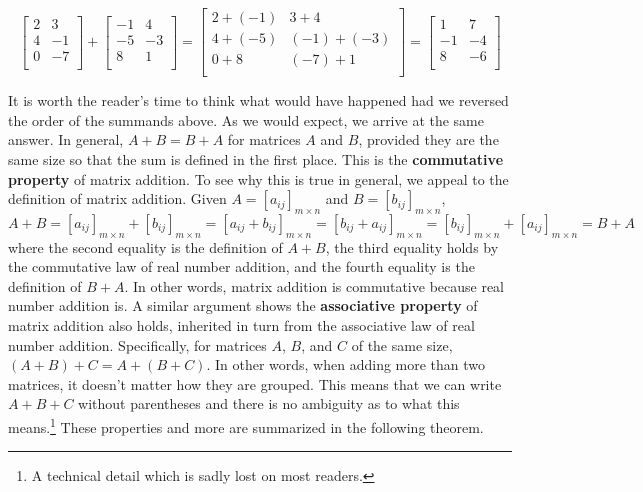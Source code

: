 \[ \left[ \begin{array}{rr}2 & 3 \\ 4 & -1 \\ 0 & -7 \\ \end{array} \right] + \left[ \begin{array}{rr} -1 & 4 \\ -5 & -3 \\ 8 & 1 \\ \end{array} \right] = \left[ \begin{array}{rr} 2 + (-1) & 3+4 \\ 4+(-5) & (-1)+(-3) \\ 0+8 & (-7)+ 1 \\ \end{array} \right]  = \left[ \begin{array}{rr} 1 & 7 \\ -1 & -4 \\ 8 & -6 \\ \end{array} \right] \]

It is worth the reader's time to think what would have happened had we reversed the order of the summands above.  As we would expect, we arrive at the same answer.  In general, $A+B = B+A$ for matrices $A$ and $B$, provided they are the same size so that the sum is defined in the first place.  This is the   \textbf{commutative property} of matrix addition.  To see why this is true in general, we appeal to the definition of matrix addition.  Given $A =\left[a_{ij}\right]_{m \times n}$ and $B =\left[b_{ij}\right]_{m \times n}$, \[A + B = \left[a_{ij}\right]_{m \times n} + \left[b_{ij}\right]_{m \times n} = \left[ a_{ij} + b_{ij} \right]_{m \times n} = \left[ b_{ij} + a_{ij} \right]_{m \times n} = \left[b_{ij}\right]_{m \times n} + \left[a_{ij}\right]_{m \times n} =B+A\] where the second equality is the definition of $A+B$, the third equality holds by the commutative law of real number addition, and the fourth equality is the definition of $B+A$.  In other words, matrix addition is commutative because real number addition is.  A similar argument shows the   \textbf{associative property} of matrix addition also holds, inherited in turn from the associative law of real number addition.  Specifically, for matrices $A$, $B$, and $C$ of the same size, $(A+B)+C = A+(B+C)$.  In other words, when adding more than two matrices, it doesn't matter how they are grouped.  This means that we can write $A+B+C$ without parentheses and there is no ambiguity as to what this means.\footnote{A technical detail which is sadly lost on most readers.} These properties and more are summarized in the following theorem.

